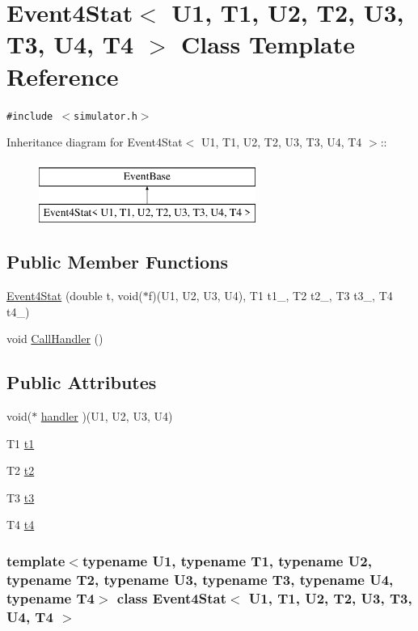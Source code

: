 \hypertarget{classEvent4Stat}{
\section{Event4Stat$<$ U1, T1, U2, T2, U3, T3, U4, T4 $>$ Class Template Reference}
\label{classEvent4Stat}
}
{\tt \#include $<$simulator.h$>$}

Inheritance diagram for Event4Stat$<$ U1, T1, U2, T2, U3, T3, U4, T4 $>$::\begin{figure}[H]
\begin{center}
\leavevmode
\includegraphics[height=2cm]{classEvent4Stat}
\end{center}
\end{figure}
\subsection*{Public Member Functions}
\begin{CompactItemize}
\item 
\hyperlink{classEvent4Stat_ef35a029c53b7da66278dd753d15a6d3}{Event4Stat} (double t, void($\ast$f)(U1, U2, U3, U4), T1 t1\_, T2 t2\_, T3 t3\_, T4 t4\_)
\item 
void \hyperlink{classEvent4Stat_4dfca297cb5eede83851898b5c4f2f76}{CallHandler} ()
\end{CompactItemize}
\subsection*{Public Attributes}
\begin{CompactItemize}
\item 
void($\ast$ \hyperlink{classEvent4Stat_77188f75f46284cde2b6baa8851e9487}{handler} )(U1, U2, U3, U4)
\item 
T1 \hyperlink{classEvent4Stat_82b1a4255a770e482d4aa975713b5150}{t1}
\item 
T2 \hyperlink{classEvent4Stat_aaa8d8169956ad7f816594902579fa52}{t2}
\item 
T3 \hyperlink{classEvent4Stat_0cb1a5a34eac05d95539aaae5dba162d}{t3}
\item 
T4 \hyperlink{classEvent4Stat_4812a9e029fb2e460a2bebdf253d7c7d}{t4}
\end{CompactItemize}
\subsubsection*{template$<$typename U1, typename T1, typename U2, typename T2, typename U3, typename T3, typename U4, typename T4$>$ class Event4Stat$<$ U1, T1, U2, T2, U3, T3, U4, T4 $>$}



